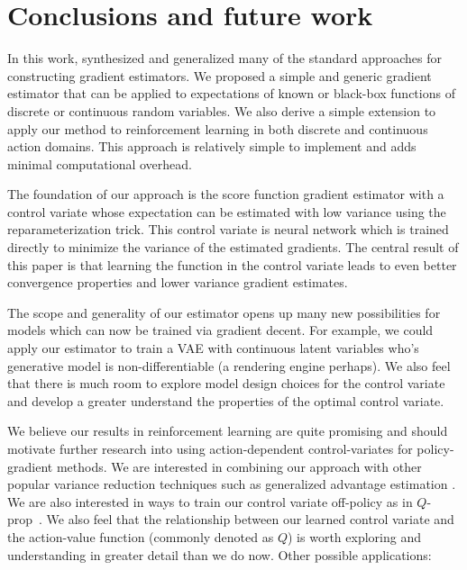 \documentclass{article}
\begin{document}


\section{Conclusions and future work}
\label{conclusion}

In this work, synthesized and generalized many of the standard approaches for constructing gradient estimators.
We proposed a simple and generic gradient estimator that can be applied to expectations of known or black-box functions of discrete or continuous random variables. We also derive a simple extension to apply our method to reinforcement learning in both discrete and continuous action domains. 
This approach is relatively simple to implement and adds minimal computational overhead. 

The foundation of our approach is the score function gradient estimator with a control variate whose expectation can be estimated with low variance using the reparameterization trick.
This control variate is neural network which is trained directly to minimize the variance of the estimated gradients.
The central result of this paper is that learning the function in the control variate leads to even better convergence properties and lower variance gradient estimates. 

The scope and generality of our estimator opens up many new possibilities for models which can now be trained via gradient decent. For example, we could apply our estimator to train a VAE with continuous latent variables who's generative model is non-differentiable (a rendering engine perhaps). We also feel that there is much room to explore model design choices for the control variate and develop a greater understand the properties of the optimal control variate. 

We believe our results in reinforcement learning are quite promising and should motivate further research into using action-dependent control-variates for policy-gradient methods. We are interested in combining our approach with other popular variance reduction techniques such as generalized advantage estimation \cite{kimura2000analysis}. We are also interested in ways to train our control variate off-policy as in $Q$-prop~\cite{gu2016q}. We also feel that the relationship between our learned control variate and the action-value function (commonly denoted as $Q$) is worth exploring and understanding in greater detail than we do now. 
Other possible applications:
\end{document}
